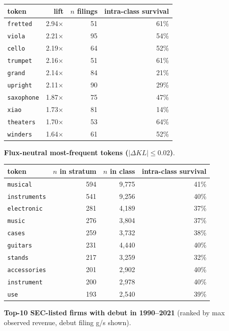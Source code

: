 \begin{tabular}{lrrr}
\toprule
token & lift & $n$ filings & intra-class survival \\
\midrule
\texttt{fretted} & 2.94$\times$ & 51 & 61\% \\
\texttt{viola} & 2.21$\times$ & 95 & 54\% \\
\texttt{cello} & 2.19$\times$ & 64 & 52\% \\
\texttt{trumpet} & 2.16$\times$ & 51 & 61\% \\
\texttt{grand} & 2.14$\times$ & 84 & 21\% \\
\texttt{upright} & 2.11$\times$ & 90 & 29\% \\
\texttt{saxophone} & 1.87$\times$ & 75 & 47\% \\
\texttt{xiao} & 1.73$\times$ & 81 & 14\% \\
\texttt{theaters} & 1.70$\times$ & 53 & 64\% \\
\texttt{winders} & 1.64$\times$ & 61 & 52\% \\
\bottomrule
\end{tabular}

\textbf{Flux-neutral most-frequent tokens ($|\Delta KL|\leq 0.02$)}.

\begin{tabular}{lrrr}
\toprule
token & $n$ in stratum & $n$ in class & intra-class survival \\
\midrule
\texttt{musical} & 594 & 9,775 & 41\% \\
\texttt{instruments} & 541 & 9,256 & 40\% \\
\texttt{electronic} & 281 & 4,189 & 37\% \\
\texttt{music} & 276 & 3,804 & 37\% \\
\texttt{cases} & 259 & 3,732 & 38\% \\
\texttt{guitars} & 231 & 4,440 & 40\% \\
\texttt{stands} & 217 & 3,259 & 32\% \\
\texttt{accessories} & 201 & 2,902 & 40\% \\
\texttt{instrument} & 200 & 2,978 & 40\% \\
\texttt{use} & 193 & 2,540 & 39\% \\
\bottomrule
\end{tabular}

\textbf{Top-10 SEC-listed firms with debut in 1990--2021} (ranked by max observed revenue, debut filing g/s shown).

